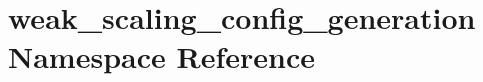 \hypertarget{namespaceweak__scaling__config__generation}{}\section{weak\+\_\+scaling\+\_\+config\+\_\+generation Namespace Reference}
\label{namespaceweak__scaling__config__generation}
